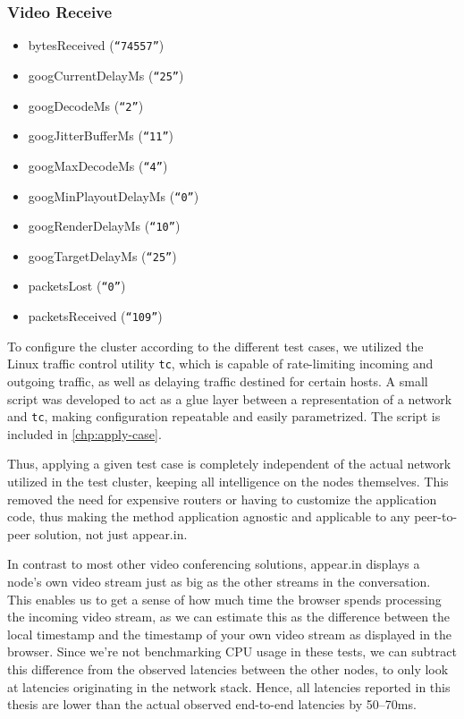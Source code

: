 \subsubsection{Video Receive}
\begin{itemize}
    \setlength\itemsep{.1em}
    \setlength\parsep{0pt}
    \setlength\parskip{0pt}
    \item bytesReceived (\texttt{``74557''})
    \item googCurrentDelayMs (\texttt{``25''})
    \item googDecodeMs (\texttt{``2''})
    \item googJitterBufferMs (\texttt{``11''})
    \item googMaxDecodeMs (\texttt{``4''})
    \item googMinPlayoutDelayMs (\texttt{``0''})
    \item googRenderDelayMs (\texttt{``10''})
    \item googTargetDelayMs (\texttt{``25''})
    \item packetsLost (\texttt{``0''})
    \item packetsReceived (\texttt{``109''})
\end{itemize}

To configure the cluster according to the different test cases, we utilized the Linux traffic control utility \texttt{tc}, which is capable of rate-limiting incoming and outgoing traffic, as well as delaying traffic destined for certain hosts. A small script was developed to act as a glue layer between a representation of a network and \texttt{tc}, making configuration repeatable and easily parametrized. The script is included in \autoref{chp:apply-case}.

Thus, applying a given test case is completely independent of the actual network utilized in the test cluster, keeping all intelligence on the nodes themselves. This removed the need for expensive routers or having to customize the application code, thus making the method application agnostic and applicable to any peer-to-peer solution, not just appear.in.

In contrast to most other video conferencing solutions, appear.in displays a node's own video stream just as big as the other streams in the conversation. This enables us to get a sense of how much time the browser spends processing the incoming video stream, as we can estimate this as the difference between the local timestamp and the timestamp of your own video stream as displayed in the browser. Since we're not benchmarking CPU usage in these tests, we can subtract this difference from the observed latencies between the other nodes, to only look at latencies originating in the network stack. Hence, all latencies reported in this thesis are lower than the actual observed end-to-end latencies by 50--70ms.

